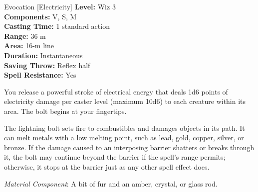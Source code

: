 {Evocation [Electricity]}
{
	\textbf{Level:}
	Wiz 3\\
	\textbf{Components:}
	V, S, M\\
	\textbf{Casting Time:}
	1 standard action\\
	\textbf{Range:}
	36 m\\
	\textbf{Area:}
	16-m line\\
	\textbf{Duration:}
	Instantaneous\\
	\textbf{Saving Throw:}
	Reflex half\\
	\textbf{Spell Resistance:}
	Yes\\
}
{
	You release a powerful stroke of electrical energy that deals 1d6 points of electricity damage per caster level (maximum 10d6) to each creature within its area. The bolt begins at your fingertips.

	The lightning bolt sets fire to combustibles and damages objects in its path. It can melt metals with a low melting point, such as lead, gold, copper, silver, or bronze. If the damage caused to an interposing barrier shatters or breaks through it, the bolt may continue beyond the barrier if the spell's range permits; otherwise, it stops at the barrier just as any other spell effect does.

	\textit{Material Component}:
	A bit of fur and an amber, crystal, or glass rod.

}
